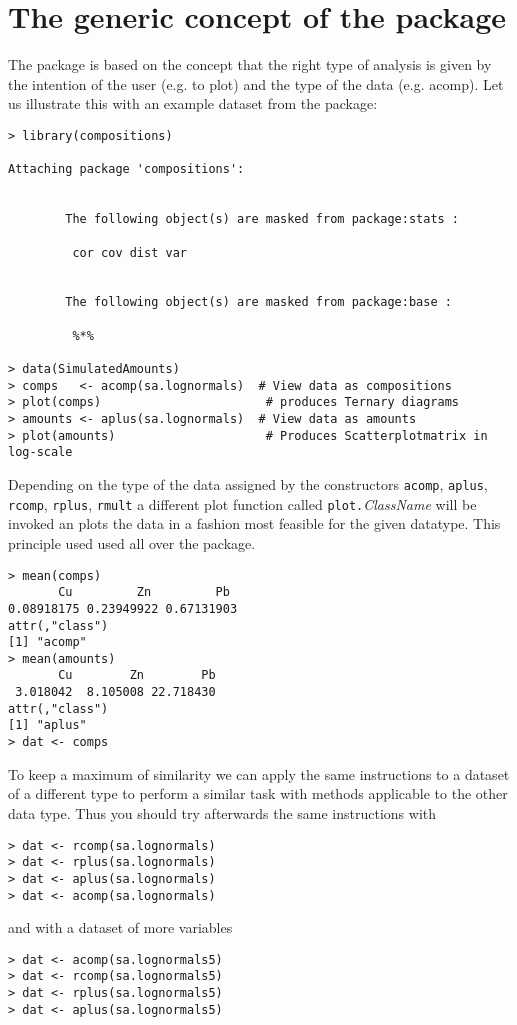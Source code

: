 \documentclass{article}
\newcommand{\code}[1]{{\tt #1}}
\begin{document}
\section{The generic concept of the package}
The package is based on the concept that the right type of analysis is given
by the intention of the user (e.g. to plot) and the type of the data
(e.g. acomp). Let us illustrate this with an example dataset from the package:
\begin{verbatim}
> library(compositions)

Attaching package 'compositions':


        The following object(s) are masked from package:stats :

         cor cov dist var 


        The following object(s) are masked from package:base :

         %*% 

> data(SimulatedAmounts)
> comps   <- acomp(sa.lognormals)  # View data as compositions
> plot(comps)                       # produces Ternary diagrams
> amounts <- aplus(sa.lognormals)  # View data as amounts
> plot(amounts)                     # Produces Scatterplotmatrix in log-scale
\end{verbatim}
Depending on the type of the data assigned by the constructors \code{acomp},
\code{aplus}, \code{rcomp}, \code{rplus}, \code{rmult} a different plot
function called \code{plot.}{\em ClassName} will be invoked an plots the data
in a fashion most feasible for the given datatype. This principle used used
all over the package.
\begin{verbatim}
> mean(comps)
       Cu         Zn         Pb 
0.08918175 0.23949922 0.67131903 
attr(,"class")
[1] "acomp"
> mean(amounts)
       Cu        Zn        Pb 
 3.018042  8.105008 22.718430 
attr(,"class")
[1] "aplus"
> dat <- comps
\end{verbatim}
To keep a maximum of similarity we can apply the same instructions to a
dataset of a different type to perform a similar task with methods applicable
to the other data type. Thus you should try afterwards the same instructions
with 
\begin{verbatim}
> dat <- rcomp(sa.lognormals)
> dat <- rplus(sa.lognormals)
> dat <- aplus(sa.lognormals)
> dat <- acomp(sa.lognormals)
\end{verbatim}
and with a  dataset of more variables
\begin{verbatim}
> dat <- acomp(sa.lognormals5)
> dat <- rcomp(sa.lognormals5)
> dat <- rplus(sa.lognormals5)
> dat <- aplus(sa.lognormals5)
\end{verbatim}
\end{document}
